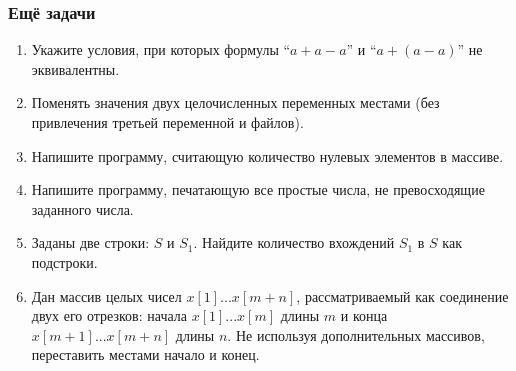 \documentclass[xetex,mathserif,serif]{beamer}
\begin{document}
    \begin{frame}
        \frametitle{Ещё задачи}
        \begin{enumerate}
            \item Укажите условия, при которых формулы ``$a + a - a$'' и ``$a + (a - a)$'' не эквивалентны.
            \item Поменять значения двух целочисленных переменных местами (без привлечения третьей переменной и файлов).
            \item Напишите программу, считающую количество нулевых элементов в массиве.
            \item Напишите программу, печатающую все простые числа, не превосходящие заданного числа.
            \item Заданы две строки: $S$ и $S_1$. Найдите количество вхождений $S_1$ в $S$ как подстроки.
            \item Дан массив целых чисел $x[1]...x[m+n]$, рассматриваемый как соединение двух его отрезков: начала $x[1]...x[m]$ длины $m$ и конца $x[m+1]...x[m+n]$ длины $n$. Не используя дополнительных массивов, переставить местами начало и конец.
        \end{enumerate}
    \end{frame}
\end{document}
